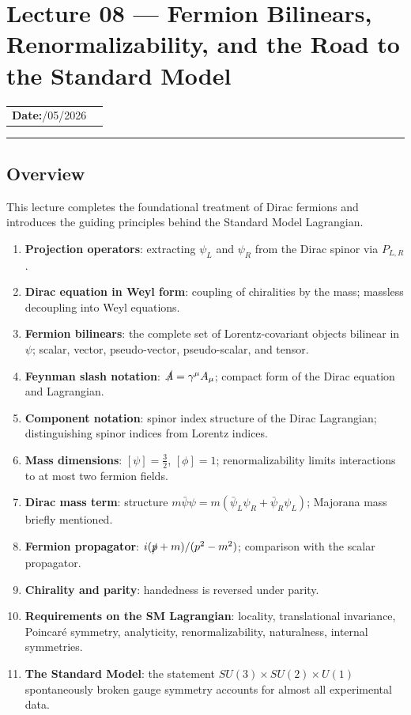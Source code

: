 \documentclass[../main.tex]{subfiles}
\begin{document}
\section{Lecture 08 — Fermion Bilinears, Renormalizability, and the Road to the Standard Model}\label{sec:lec08}
\begin{center}
\begin{tabular}{ll}
  \textbf{Date:}\quad 03/05/2026 & \\
\end{tabular}
\end{center}
\hrule\vspace{1.5em}
\subsection*{Overview}

This lecture completes the foundational treatment of Dirac fermions and introduces the guiding principles behind the Standard Model Lagrangian.

\begin{enumerate}
  \item \textbf{Projection operators}: extracting $\psi_L$ and $\psi_R$ from the Dirac spinor via $P_{L,R}$.
  \item \textbf{Dirac equation in Weyl form}: coupling of chiralities by the mass; massless decoupling into Weyl equations.
  \item \textbf{Fermion bilinears}: the complete set of Lorentz-covariant objects bilinear in $\psi$; scalar, vector, pseudo-vector, pseudo-scalar, and tensor.
  \item \textbf{Feynman slash notation}: $\slashed{A} = \gamma^\mu A_\mu$; compact form of the Dirac equation and Lagrangian.
  \item \textbf{Component notation}: spinor index structure of the Dirac Lagrangian; distinguishing spinor indices from Lorentz indices.
  \item \textbf{Mass dimensions}: $[\psi] = \tfrac{3}{2}$, $[\phi] = 1$; renormalizability limits interactions to at most two fermion fields.
  \item \textbf{Dirac mass term}: structure $m\bar\psi\psi = m(\bar\psi_L\psi_R + \bar\psi_R\psi_L)$; Majorana mass briefly mentioned.
  \item \textbf{Fermion propagator}: $i(\slashed{p}+m)/(p^2-m^2)$; comparison with the scalar propagator.
  \item \textbf{Chirality and parity}: handedness is reversed under parity.
  \item \textbf{Requirements on the SM Lagrangian}: locality, translational invariance, Poincaré symmetry, analyticity, renormalizability, naturalness, internal symmetries.
  \item \textbf{The Standard Model}: the statement $SU(3)\times SU(2)\times U(1)$ spontaneously broken gauge symmetry accounts for almost all experimental data.
\end{enumerate}
\end{document}
